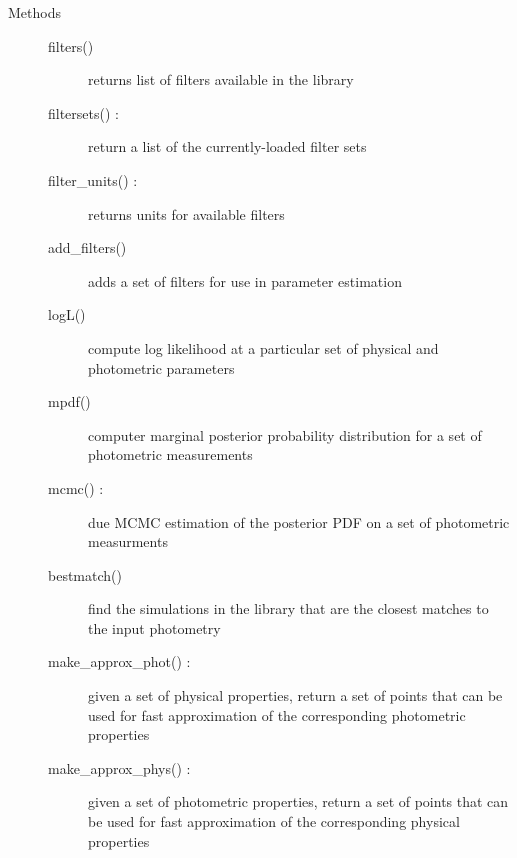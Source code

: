 \documentclass[letterpaper,10pt,english]{sphinxmanual}
\begin{document}
\begin{fulllineitems}
\begin{description}
\item[{Methods}] \leavevmode\begin{description}
\item[{filters()}] \leavevmode{[}{]}
returns list of filters available in the library

\item[{filtersets() :}] \leavevmode
return a list of the currently-loaded filter sets

\item[{filter\_units() :}] \leavevmode
returns units for available filters

\item[{add\_filters()}] \leavevmode{[}{]}
adds a set of filters for use in parameter estimation

\item[{logL()}] \leavevmode{[}{]}
compute log likelihood at a particular set of physical and
photometric parameters

\item[{mpdf()}] \leavevmode{[}{]}
computer marginal posterior probability distribution for a
set of photometric measurements

\item[{mcmc() :}] \leavevmode
due MCMC estimation of the posterior PDF on a set of
photometric measurments

\item[{bestmatch()}] \leavevmode{[}{]}
find the simulations in the library that are the closest
matches to the input photometry

\item[{make\_approx\_phot() :}] \leavevmode
given a set of physical properties, return a set of points
that can be used for fast approximation of the corresponding
photometric properties

\item[{make\_approx\_phys() :}] \leavevmode
given a set of photometric properties, return a set of points
that can be used for fast approximation of the corresponding
physical properties

\end{description}

\end{description}


\end{fulllineitems}
\end{document}
